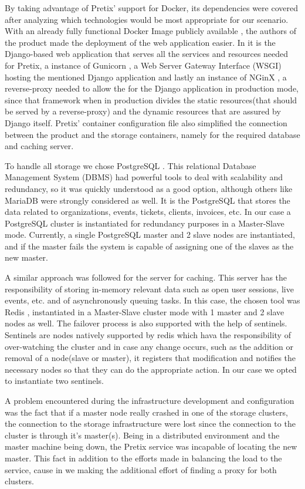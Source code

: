 \documentclass[12pt]{article}
\begin{document}
By taking advantage of Pretix' support for Docker, its dependencies were covered after analyzing which technologies would be most appropriate for our scenario.
With an already fully functional Docker Image publicly available \cite{pretix_img}, the authors of the product made the deployment of the web application easier.
In it is the Django-based \cite{django} web application that serves all the services and resources needed for Pretix, a instance of Gunicorn \cite{gunicorn}, a Web Server Gateway Interface (WSGI) hosting the mentioned Django application and lastly an instance of NGinX \cite{nginx}, a reverse-proxy needed to allow the for the Django application in production mode, since that framework when in production divides the static resources(that should be served by a reverse-proxy) and the dynamic resources that are assured by Django itself.
Pretix' container configuration file also simplified the connection between the product and the storage containers, namely for the required database and caching server.

To handle all storage we chose PostgreSQL \cite{postgresql}.
This relational Database Management System (DBMS) had powerful tools to deal with scalability and redundancy, so it was quickly understood as a good option, 
although others like MariaDB were strongly considered as well.
It is the PostgreSQL that stores the data related to organizations, events, tickets, clients, invoices, etc.
In our case a PostgreSQL cluster is instantiated for redundancy purposes in a Master-Slave mode.
Currently, a single PostgreSQL master and 2 slave nodes are instantiated, and if the master fails the system is capable of assigning one of the slaves as the new master.

A similar approach was followed for the server for caching.
This server has the responsibility of storing in-memory relevant data such as open user sessions, live events, etc. and of asynchronously queuing tasks.
In this case, the chosen tool was Redis \cite{redis}, instantiated in a Master-Slave cluster mode with 1 master and 2 slave nodes as well. The failover process is also supported with the help of sentinels. Sentinels are nodes natively supported by redis which hava the responsibility of over-watching the cluster and in case any change occurs, such as the addition or removal of a node(slave or master), it registers that modification and notifies the necessary nodes so that they can do the appropriate action. In our case we opted to instantiate two sentinels.  

A problem encountered during the infrastructure development and configuration was the fact that if a master node really crashed in one of the storage clusters, the connection to the storage infrastructure were lost since the connection to the cluster is through it's master(s). Being in a distributed environment and the master machine being down, the Pretix service was incapable of locating the new master. This fact in addition to the efforts made in balancing the load to the service, cause in we making the additional effort of finding a proxy for both clusters.
\end{document}
